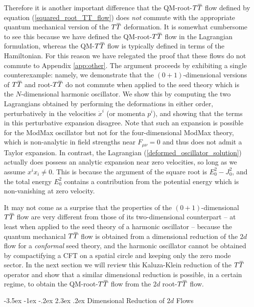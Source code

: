 \documentclass[12pt]{article}
\makeatletter
\numberwithin{equation}{section}
\renewcommand\section{\@startsection {section}{1}{\z@}%
                                   {-3.5ex \@plus -1ex \@minus -.2ex}%
                                   {2.3ex \@plus.2ex}%
                                   {\normalfont\large\bfseries}}
\newcommand{\overbar}[1]{\mkern 1.5mu\overline{\mkern-1.5mu#1\mkern-1.5mu}\mkern 1.5mu}
\def\TT{{T\overbar{T}}}
\makeatother
\begin{document}
Therefore it is another important difference that the QM-root-$\TT$ flow defined by equation (\ref{squared_root_TT_flow}) does \emph{not} commute with the appropriate quantum mechanical version of the $\TT$ deformation. It is somewhat cumbersome to see this because we have defined the QM-root-$\TT$ flow in the Lagrangian formulation, whereas the QM-$\TT$ flow is typically defined in terms of the Hamiltonian. For this reason we have relegated the proof that these flows do not commute to Appendix \ref{app:other}. The argument proceeds by exhibiting a single counterexample: namely, we demonstrate that the $(0+1)$-dimensional versions of $\TT$ and root-$\TT$ do not commute when applied to the seed theory which is the $N$-dimensional harmonic oscillator. We show this by computing the two Lagrangians obtained by performing the deformations in either order, perturbatively in the velocities $\dot{x}^i$ (or momenta $p^i$), and showing that the terms in this perturbative expansion disagree. Note that such an expansion is possible for the ModMax oscillator but not for the four-dimensional ModMax theory, which is non-analytic in field strengths near $F_{\mu \nu} = 0$ and thus does not admit a Taylor expansion. In contrast, the Lagrangian (\ref{deformed_oscillator_solution}) actually does possess an analytic expansion near zero velocities, so long as we assume $x^i x_i \neq 0$. This is because the argument of the square root is $E_0^2 - J_0^2$, and the total energy $E_0^2$ contains a contribution from the potential energy which is non-vanishing at zero velocity.

It may not come as a surprise that the properties of the $(0+1)$-dimensional $\TT$ flow are very different from those of its two-dimensional counterpart -- at least when applied to the seed theory of a harmonic oscillator -- 
 because the quantum mechanical $\TT$ flow is obtained from a dimensional reduction of the $2d$ flow for a \emph{conformal} seed theory, and the harmonic oscillator cannot be obtained by compactifying a CFT on a spatial circle and keeping only the zero mode sector. In the next section we will review this Kaluza-Klein reduction of the $\TT$ operator and show that a similar dimensional reduction is possible, in a certain regime, to obtain the QM-root-$\TT$ flow from the $2d$ root-$\TT$ flow.


\section{Dimensional Reduction of $2d$ Flows}\label{sec:dim_red}
\end{document}
